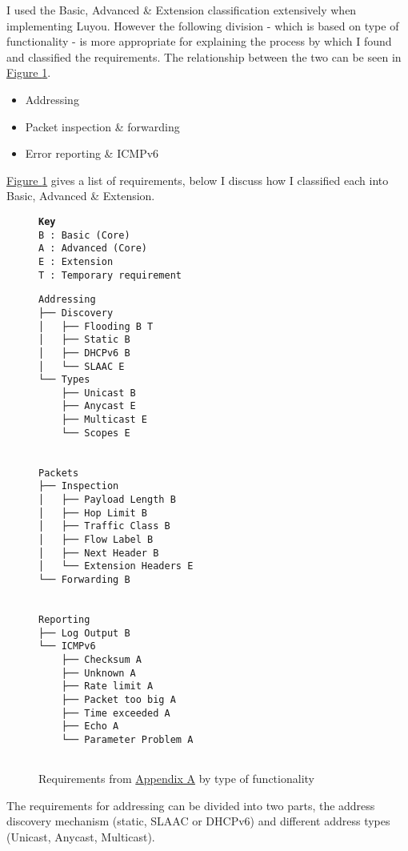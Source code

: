 \documentclass[12pt,a4paper,twoside,openright]{report}
\begin{document}
\bigskip

I used the Basic, Advanced \& Extension classification extensively when implementing Luyou. However the following division - which is based on type of functionality - is more appropriate for explaining the process by which I found and classified the requirements. The relationship between the two can be seen in \hyperref[fig::requirements]{Figure }\ref{fig::requirements}.
\begin{itemize}
\item Addressing
\item Packet inspection \& forwarding
\item Error reporting \& ICMPv6\cite{icmpv6_rfc}
\end{itemize}
\hyperref[fig::requirements]{Figure }\ref{fig::requirements} gives a list of requirements, below I discuss how I classified each into Basic, Advanced \& Extension.

\begin{figure}
\texttt{\textbf{Key} \\
B : Basic (Core) \\
A : Advanced (Core) \\
E : Extension \\
T : Temporary requirement
}
\begin{lstlisting}[style=tree]
Addressing
├── Discovery
│   ├── Flooding B T
│   ├── Static B 
│   ├── DHCPv6 B 
│   └── SLAAC E
└── Types
    ├── Unicast B
    ├── Anycast E
    ├── Multicast E
    └── Scopes E


Packets
├── Inspection
│   ├── Payload Length B 
│   ├── Hop Limit B 
│   ├── Traffic Class B 
│   ├── Flow Label B 
│   ├── Next Header B 
│   └── Extension Headers E
└── Forwarding B


Reporting
├── Log Output B
└── ICMPv6  
    ├── Checksum A
    ├── Unknown A
    ├── Rate limit A
    ├── Packet too big A
    ├── Time exceeded A
    ├── Echo A
    └── Parameter Problem A
 
\end{lstlisting}
\caption{Requirements from \hyperref[appendix::requirements]{Appendix A} by type of functionality}
\label{fig::requirements}
\end{figure}

\bigskip

The requirements for addressing can be divided into two parts, the address discovery mechanism (static, SLAAC\cite{slaac_rfc} or DHCPv6\cite{dhcpv6_rfc}) and different address types (Unicast, Anycast, Multicast).  
\end{document}
